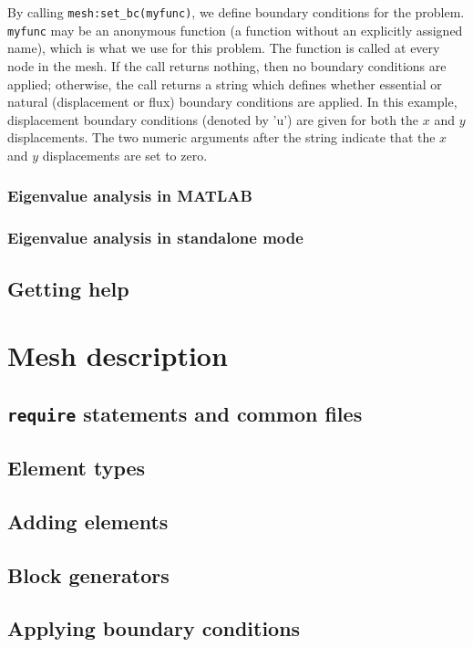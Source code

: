 \documentclass{article}
\newcommand{\ttt}[1]{\texttt{#1}}
\begin{document}
\begin{itemize}
By calling \ttt{mesh:set\_bc(myfunc)}, we define boundary conditions
for the problem.  \ttt{myfunc} may be an anonymous function (a
function without an explicitly assigned name), which is what we use
for this problem.  The function is called at every node in the mesh.
If the call returns nothing, then no boundary conditions are applied;
otherwise, the call returns a string which defines whether essential
or natural (displacement or flux) boundary conditions are applied.  In
this example, displacement boundary conditions (denoted by 'u') are
given for both the $x$ and $y$ displacements.  The two numeric
arguments after the string indicate that the $x$ and $y$ displacements
are set to zero.

\end{itemize}

\subsubsection{Eigenvalue analysis in MATLAB}
\subsubsection{Eigenvalue analysis in standalone mode}

\subsection{Getting help}


\section{Mesh description}

\subsection{\ttt{require} statements and common files}
\label{require-section}

\subsection{Element types}
\subsection{Adding elements}
\subsection{Block generators}
\subsection{Applying boundary conditions}
\end{document}
